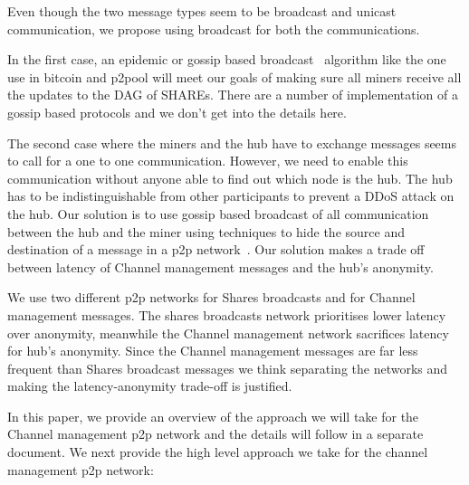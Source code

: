 \documentclass{article}
\begin{document}
Even though the two message types seem to be broadcast and unicast
communication, we propose using broadcast for both the communications.

In the first case, an epidemic or gossip based
broadcast~\cite{epidemic-algorithms} algorithm like the one use in
bitcoin and p2pool will meet our goals of making sure all miners
receive all the updates to the DAG of \textsc{SHARE}s. There are a
number of implementation of a gossip based protocols and we don't get
into the details here.

The second case where the miners and the hub have to exchange messages
seems to call for a one to one communication. However, we need to
enable this communication without anyone able to find out which node
is the hub. The hub has to be indistinguishable from other
participants to prevent a DDoS attack on the hub. Our solution is to
use gossip based broadcast of all communication between the hub and
the miner using techniques to hide the source and destination of a
message in a p2p network~\cite{responder-anonymity:file-sharing,
  liu2010rumor, responder-anonymity:p2p, gap-gnunet,
  rumor-riding, p5}. Our solution makes a trade off between latency of
Channel management messages and the hub's anonymity.

We use two different p2p networks for Shares broadcasts and for
Channel management messages. The shares broadcasts network prioritises
lower latency over anonymity, meanwhile the Channel management network
sacrifices latency for hub's anonymity. Since the Channel management
messages are far less frequent than Shares broadcast messages we
think separating the networks and making the latency-anonymity
trade-off is justified.

In this paper, we provide an overview of the approach we will take for
the Channel management p2p network and the details will follow in a
separate document. We next provide the high level approach we take for
the channel management p2p network:
\end{document}
